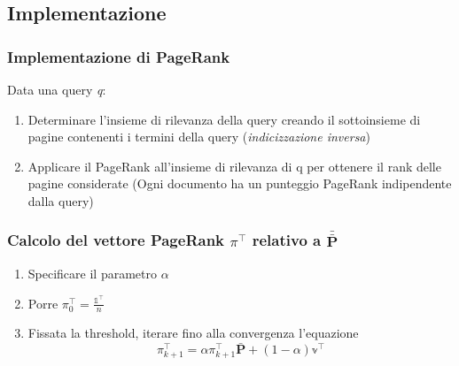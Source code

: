 \documentclass{beamer}
\begin{document}
\subsection{Implementazione}
\begin{frame}
	\frametitle{Implementazione di PageRank}
	Data una query \emph{q}:
	\begin{enumerate}
		\item Determinare l'insieme di rilevanza della query creando il sottoinsieme di pagine contenenti i termini della query (\emph{indicizzazione inversa})
		\item Applicare il PageRank all'insieme di rilevanza di q per ottenere il rank delle pagine considerate (Ogni documento ha un punteggio PageRank indipendente dalla query)
	\end{enumerate}
\end{frame}
\begin{frame}
	\frametitle{Calcolo del vettore PageRank $\pi^\intercal$ relativo a $\bar{\bar{\textbf{P}}}$}
	\begin{enumerate}
		\item Specificare il parametro $\alpha$
		\item Porre $\pi_0^\intercal=\frac{\mathbb{1}^\intercal}{n}$
		\item Fissata la threshold, iterare fino alla convergenza l'equazione $$\pi_{k+1}^\intercal = \alpha \pi_{k+1}^\intercal \bar{\textbf{P}} + (1- \alpha) \mathbb{v}^\intercal  $$
	\end{enumerate}
\end{frame}
\end{document}
